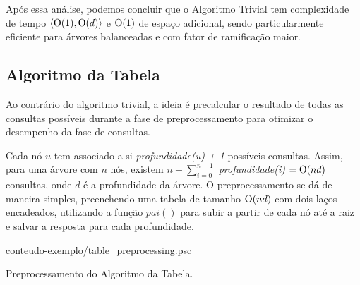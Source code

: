 Após essa análise, podemos concluir que o Algoritmo Trivial tem complexidade de tempo
$\langle \mathrm{O}(1), \mathrm{O}(d) \rangle$ e $\mathrm{O}(1)$ de espaço adicional, sendo
particularmente eficiente para árvores balanceadas e com fator de ramificação maior.


\subsection{Algoritmo da Tabela}
Ao contrário do algoritmo trivial, a ideia é precalcular o resultado de todas
as consultas possíveis durante a fase de preprocessamento para otimizar o
desempenho da fase de consultas.

Cada nó $u$ tem associado a si \textit{profundidade(u) + 1} possíveis consultas. Assim,
para uma árvore com $n$ nós, existem $n + \sum_{i=0}^{n-1}$ \textit{profundidade(i)}
$= \mathrm{O}(nd)$ consultas, onde $d$ é a profundidade da árvore. O preprocessamento se dá
de maneira simples, preenchendo uma tabela de tamanho $\mathrm{O}(nd)$ com dois laços
encadeados, utilizando a função $pai()$ para subir a partir de cada nó até a raiz e
salvar a resposta para cada profundidade.

\begin{program}[]
  
  {conteudo-exemplo/table_preprocessing.psc}

  \caption{Preprocessamento do Algoritmo da Tabela.\label{prog:tableproc}}
\end{program}


